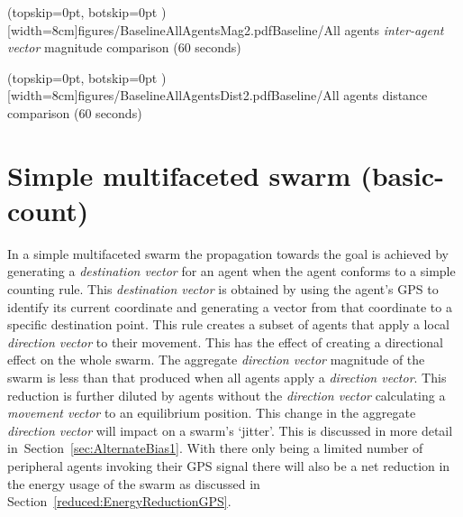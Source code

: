 \documentclass{ieeeaccess}
\begin{document}
\Figure[t!](topskip=0pt, botskip=0pt )[width=8cm]{figures/BaselineAllAgentsMag2.pdf}{Baseline/All agents \textit{inter-agent vector} magnitude comparison (60 seconds)\label{reduced:BaselineAllAgentsMag2}}


\Figure[t!](topskip=0pt, botskip=0pt )[width=8cm]{figures/BaselineAllAgentsDist2.pdf}{Baseline/All agents distance comparison (60 seconds)\label{reduced:BaselineAllAgentsDist2}}

\section{Simple multifaceted swarm (basic-count)} 
In a simple multifaceted swarm the propagation towards the goal is achieved by generating a \textit{destination vector} for an agent when the agent conforms to a simple counting rule. This \textit{destination vector} is obtained by using the agent's GPS to identify its current coordinate and generating a vector from that coordinate to a specific destination point. This rule creates a subset of agents that apply a local \textit{direction vector} to their movement. This has the effect of creating a directional effect on the whole swarm. The aggregate \textit{direction vector} magnitude of the swarm is less than that produced when all agents apply a \textit{direction vector}. This reduction is further diluted by agents without the \textit{direction vector} calculating a \textit{movement vector} to an equilibrium position. This change in the aggregate \textit{direction vector} will impact on a swarm's `jitter'. This is discussed in more detail in~Section~\ref{sec:AlternateBias1}. With there only being a limited number of peripheral agents invoking their GPS signal there will also be a net reduction in the energy usage of the swarm as discussed in Section~\ref{reduced:EnergyReductionGPS}.
\end{document}

